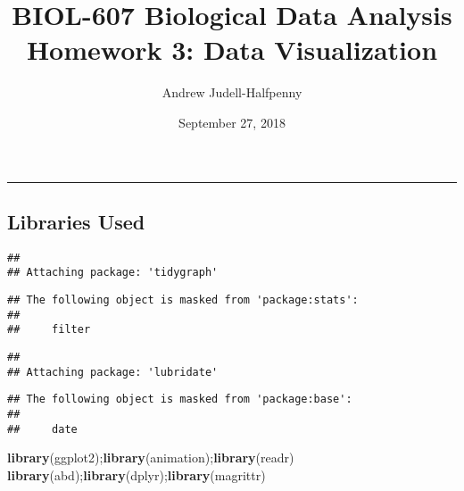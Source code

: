 \documentclass[]{article}
\title{BIOL-607 Biological Data Analysis Homework 3: Data Visualization}
\author{Andrew Judell-Halfpenny}
\date{September 27, 2018}
\newenvironment{Shaded}{\begin{snugshade}}{\end{snugshade}}
\newcommand{\KeywordTok}[1]{\textcolor[rgb]{0.13,0.29,0.53}{\textbf{#1}}}
\newcommand{\CommentTok}[1]{\textcolor[rgb]{0.56,0.35,0.01}{\textit{#1}}}
\newcommand{\NormalTok}[1]{#1}
\begin{document}
\maketitle

\begin{center}\rule{0.5\linewidth}{\linethickness}\end{center}

\subsection{Libraries Used}\label{libraries-used}

\begin{Shaded}
\end{Shaded}

\begin{verbatim}
## 
## Attaching package: 'tidygraph'
\end{verbatim}

\begin{verbatim}
## The following object is masked from 'package:stats':
## 
##     filter
\end{verbatim}

\begin{verbatim}
## 
## Attaching package: 'lubridate'
\end{verbatim}

\begin{verbatim}
## The following object is masked from 'package:base':
## 
##     date
\end{verbatim}

\begin{Shaded}
\begin{Highlighting}[]
\KeywordTok{library}\NormalTok{(ggplot2);}\KeywordTok{library}\NormalTok{(animation);}\KeywordTok{library}\NormalTok{(readr)}
\KeywordTok{library}\NormalTok{(abd);}\KeywordTok{library}\NormalTok{(dplyr);}\KeywordTok{library}\NormalTok{(magrittr)}
\end{Highlighting}
\end{Shaded}
\end{document}
